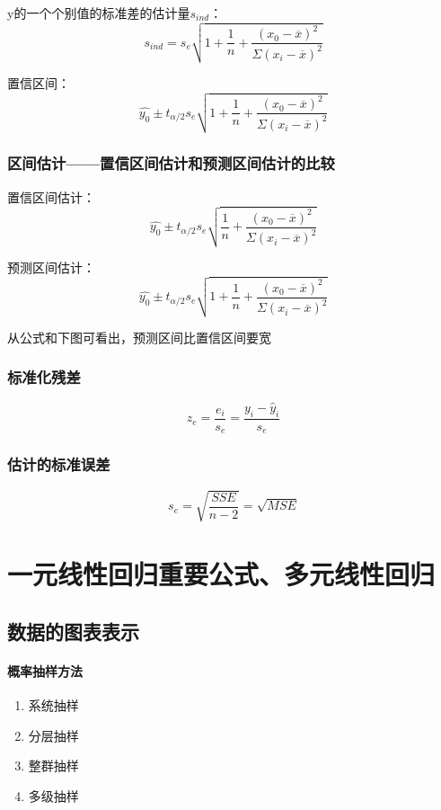 \documentclass[UTF8,10pt]{book}
\begin{document}
y的一个个别值的标准差的估计量$s_{ind}$： 
$$ s_{ind} = s_e \sqrt{1+\frac{1}{n} + \frac{(x_0 - \overline{x})^2}{\Sigma (x_i - \overline{x})^2}} $$ 

置信区间： 
$$ \hat{y_0} \pm t_{\alpha / 2} s_e \sqrt{1+ \frac{1}{n} + \frac{(x_0 - \overline{x})^2}{\Sigma (x_i - \overline{x})^2}} $$

\subsection{区间估计——置信区间估计和预测区间估计的比较}	

置信区间估计： 
$$ \hat{y_0} \pm t_{\alpha / 2} s_e \sqrt{ \frac{1}{n} + \frac{(x_0 - \overline{x})^2}{\Sigma (x_i - \overline{x})^2}} $$ 

预测区间估计： 
$$ \hat{y_0} \pm t_{\alpha / 2} s_e \sqrt{1+ \frac{1}{n} + \frac{(x_0 - \overline{x})^2}{\Sigma (x_i - \overline{x})^2}} $$ 

从公式和下图可看出，预测区间比置信区间要宽

\subsection{标准化残差}	
$$ z_e = \frac{e_i}{s_e}= \frac{y_i - \hat{y}_i}{s_e} $$

\subsection{估计的标准误差}	

$$ s_e = \sqrt{ \frac{SSE}{n-2} } = \sqrt{MSE} $$

\clearpage

\chapter{一元线性回归重要公式、多元线性回归}

\section{数据的图表表示}\label{header-n2}

\subsubsection{概率抽样方法}\label{header-n3}

\begin{enumerate}
	\def\labelenumi{\arabic{enumi}.}
	\item
	系统抽样
	\item
	分层抽样
	\item
	整群抽样
	\item
	多级抽样
\end{enumerate}
\end{document}

